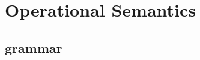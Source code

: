 \documentclass{article}
\begin{document}
  \section{Operational Semantics}
    \subsection{grammar}
    \begin{grammar}

    \end{grammar}
\end{document}
